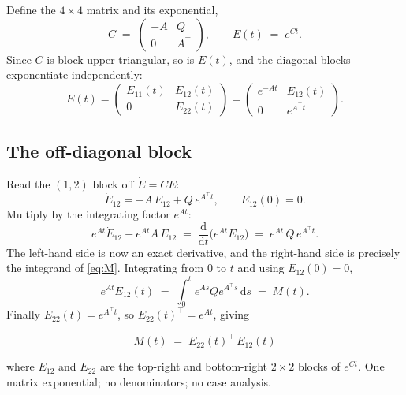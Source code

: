 \documentclass[11pt]{article}
\newcommand{\dd}{\mathrm{d}}
\begin{document}
Define the $4\times4$ matrix and its exponential,
\begin{equation}
C \;=\; \begin{pmatrix} -A & Q\\ 0 & A^{\!\top}\end{pmatrix},
\qquad
E(t) \;=\; e^{Ct}.
\label{eq:C}
\end{equation}
Since $C$ is block upper triangular, so is $E(t)$, and the diagonal blocks exponentiate
independently:
\begin{equation}
E(t) = \begin{pmatrix} E_{11}(t) & E_{12}(t)\\ 0 & E_{22}(t)\end{pmatrix}
     = \begin{pmatrix} e^{-At} & E_{12}(t)\\ 0 & e^{A^{\!\top}\!t}\end{pmatrix}.
\label{eq:blocks}
\end{equation}

\subsection{The off-diagonal block}

Read the $(1,2)$ block off $\dot E = CE$:
\begin{equation}
\dot E_{12} = -A\,E_{12} + Q\,e^{A^{\!\top}\!t},\qquad E_{12}(0)=0.
\end{equation}
Multiply by the integrating factor $e^{At}$:
\begin{equation}
e^{At}\dot E_{12} + e^{At}A\,E_{12}
\;=\;
\frac{\dd}{\dd t}\Big(e^{At}E_{12}\Big)
\;=\;
e^{At}\,Q\,e^{A^{\!\top}\!t}.
\label{eq:exact}
\end{equation}
The left-hand side is now an exact derivative, and the right-hand side is precisely the
integrand of \eqref{eq:M}. Integrating from $0$ to $t$ and using $E_{12}(0)=0$,
\begin{equation}
e^{At}E_{12}(t) \;=\; \int_0^t e^{As}Qe^{A^{\!\top}\!s}\,\dd s \;=\; M(t).
\end{equation}
Finally $E_{22}(t)=e^{A^{\!\top}\!t}$, so $E_{22}(t)^{\!\top}=e^{At}$, giving

\begin{equation}
\boxed{\;M(t) \;=\; E_{22}(t)^{\!\top}\,E_{12}(t)\;}
\label{eq:vanloan}
\end{equation}

\noindent
where $E_{12}$ and $E_{22}$ are the top-right and bottom-right $2\times2$ blocks of
$e^{Ct}$. One matrix exponential; no denominators; no case analysis.
\end{document}
